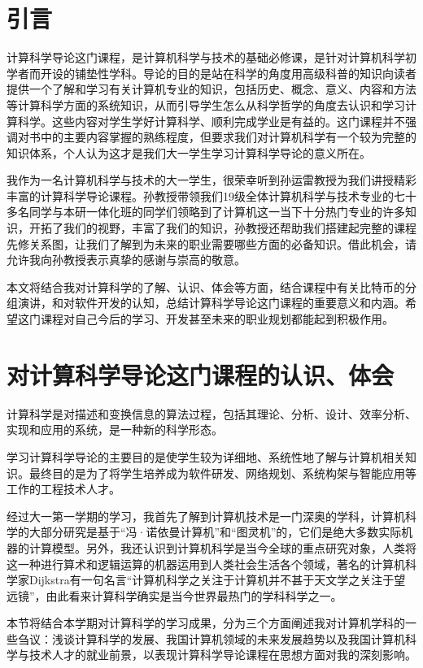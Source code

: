 \documentclass{article}
\begin{document}
\thispagestyle{empty}
\newpage
\setcounter{page}{1}
\section{引言}
计算科学导论这门课程，是计算机科学与技术的基础必修课，是针对计算机科学初学者而开设的铺垫性学科。导论的目的是站在科学的角度用高级科普的知识向读者提供一个了解和学习有关计算机专业的知识，包括历史、概念、意义、内容和方法等计算科学方面的系统知识，从而引导学生怎么从科学哲学的角度去认识和学习计算科学。这些内容对学生学好计算科学、顺利完成学业是有益的。这门课程并不强调对书中的主要内容掌握的熟练程度，但要求我们对计算机科学有一个较为完整的知识体系，个人认为这才是我们大一学生学习计算科学导论的意义所在。\par
我作为一名计算机科学与技术的大一学生，很荣幸听到孙运雷教授为我们讲授精彩丰富的计算科学导论课程。孙教授带领我们19级全体计算机科学与技术专业的七十多名同学与本研一体化班的同学们领略到了计算机这一当下十分热门专业的许多知识，开拓了我们的视野，丰富了我们的知识，孙教授还帮助我们搭建起完整的课程先修关系图，让我们了解到为未来的职业需要哪些方面的必备知识。借此机会，请允许我向孙教授表示真挚的感谢与崇高的敬意。\par
本文将结合我对计算科学的了解、认识、体会等方面，结合课程中有关比特币的分组演讲，和对软件开发的认知，总结计算科学导论这门课程的重要意义和内涵。希望这门课程对自己今后的学习、开发甚至未来的职业规划都能起到积极作用。\par

\section{对计算科学导论这门课程的认识、体会}
计算科学是对描述和变换信息的算法过程，包括其理论、分析、设计、效率分析、实现和应用的系统，是一种新的科学形态。\par
学习计算科学导论的主要目的是使学生较为详细地、系统性地了解与计算机相关知识。最终目的是为了将学生培养成为软件研发、网络规划、系统构架与智能应用等工作的工程技术人才。\par
经过大一第一学期的学习，我首先了解到计算机技术是一门深奥的学科，计算机科学的大部分研究是基于“冯·诺依曼计算机”和“图灵机”的，它们是绝大多数实际机器的计算模型。另外，我还认识到计算机科学是当今全球的重点研究对象，人类将这一种进行算术和逻辑运算的机器运用到人类社会生活各个领域，著名的计算机科学家Dijkstra有一句名言“计算机科学之关注于计算机并不甚于天文学之关注于望远镜”，由此看来计算科学确实是当今世界最热门的学科科学之一。\par
本节将结合本学期对计算科学的学习成果，分为三个方面阐述我对计算机学科的一些刍议：浅谈计算科学的发展、我国计算机领域的未来发展趋势以及我国计算机科学与技术人才的就业前景，以表现计算科学导论课程在思想方面对我的深刻影响。\par
\end{document}
